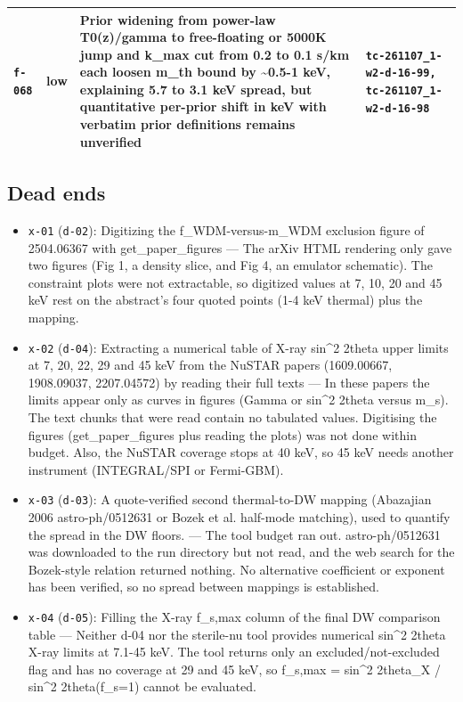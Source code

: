 \documentclass[11pt,a4paper]{article}
\begin{document}
\begin{longtable}{@{}p{}p{}p{}p{}@{}}
\texttt{f-068} & low & Prior widening from power-law T0(z)/gamma to free-floating or 5000K jump and k\_max cut from 0.2 to 0.1 s/km each loosen m\_th bound by \textasciitilde{}0.5-1 keV, explaining 5.7 to 3.1 keV spread, but quantitative per-prior shift in keV with verbatim prior definitions remains unverified & \texttt{tc-261107\_\allowbreak{}1-w2-d-16-99,\allowbreak{} tc-261107\_\allowbreak{}1-w2-d-16-98} \\
\bottomrule\end{longtable}
\subsection{Dead ends}
\begin{itemize}
  \item \texttt{x-01} (\texttt{d-02}): Digitizing the f\_WDM-versus-m\_WDM exclusion figure of 2504.06367 with get\_paper\_figures --- The arXiv HTML rendering only gave two figures (Fig 1, a density slice, and Fig 4, an emulator schematic). The constraint plots were not extractable, so digitized values at 7, 10, 20 and 45 keV rest on the abstract's four quoted points (1-4 keV thermal) plus the mapping.
  \item \texttt{x-02} (\texttt{d-04}): Extracting a numerical table of X-ray sin\textasciicircum{}2 2theta upper limits at 7, 20, 22, 29 and 45 keV from the NuSTAR papers (1609.00667, 1908.09037, 2207.04572) by reading their full texts --- In these papers the limits appear only as curves in figures (Gamma or sin\textasciicircum{}2 2theta versus m\_s). The text chunks that were read contain no tabulated values. Digitising the figures (get\_paper\_figures plus reading the plots) was not done within budget. Also, the NuSTAR coverage stops at 40 keV, so 45 keV needs another instrument (INTEGRAL/SPI or Fermi-GBM).
  \item \texttt{x-03} (\texttt{d-03}): A quote-verified second thermal-to-DW mapping (Abazajian 2006 astro-ph/0512631 or Bozek et al. half-mode matching), used to quantify the spread in the DW floors. --- The tool budget ran out. astro-ph/0512631 was downloaded to the run directory but not read, and the web search for the Bozek-style relation returned nothing. No alternative coefficient or exponent has been verified, so no spread between mappings is established.
  \item \texttt{x-04} (\texttt{d-05}): Filling the X-ray f\_s,max column of the final DW comparison table --- Neither d-04 nor the sterile-nu tool provides numerical sin\textasciicircum{}2 2theta X-ray limits at 7.1-45 keV. The tool returns only an excluded/not-excluded flag and has no coverage at 29 and 45 keV, so f\_s,max = sin\textasciicircum{}2 2theta\_X / sin\textasciicircum{}2 2theta(f\_s=1) cannot be evaluated.

\end{itemize}
\end{document}
